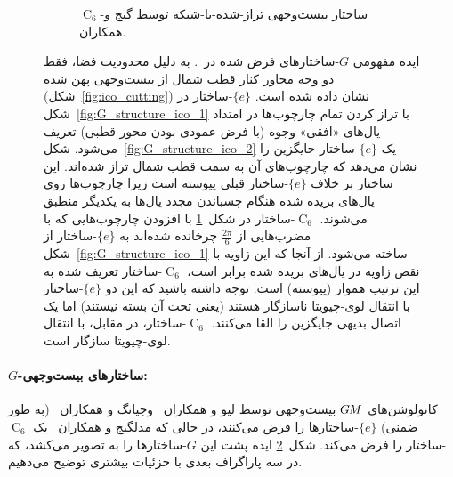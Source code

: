 \begin{figure}
\begin{subfigure}[b]{0.31\textwidth}
        \vspace*{-6pt}
        \captionsetup{width=.9\textwidth}
        \caption{\small
            $\operatorname{C}_6$-ساختار بیست‌وجهی تراز-شده-با-شبکه توسط گیج و همکاران\cite{gaugeIco2019}.
        }
        \label{fig:G_structure_ico_3}
    \end{subfigure}
    \caption{\small
        ایده مفهومی $G$-ساختارهای فرض شده در~\cite{liu2018icoAltAz,zhang2019orientation,gaugeIco2019}.
        به دلیل محدودیت فضا، فقط دو وجه مجاور کنار قطب شمال از بیست‌وجهی پهن شده (شکل~\ref{fig:ico_cutting}) نشان داده شده است.
        $\{e\}$-ساختار در شکل~\ref{fig:G_structure_ico_1} با تراز کردن تمام چارچوب‌ها در امتداد یال‌های «افقی» وجوه (با فرض عمودی بودن محور قطبی) تعریف می‌شود.
        شکل~\ref{fig:G_structure_ico_2} یک $\{e\}$-ساختار جایگزین را نشان می‌دهد که چارچوب‌های آن به سمت قطب شمال تراز شده‌اند.
        این ساختار بر خلاف $\{e\}$-ساختار قبلی پیوسته است زیرا چارچوب‌ها روی یال‌های بریده شده هنگام چسباندن مجدد یال‌ها به یکدیگر منطبق می‌شوند.
        $\operatorname{C}_6$-ساختار در شکل~\ref{fig:G_structure_ico_3} با افزودن چارچوب‌هایی که با مضرب‌هایی از $\frac{2\pi}{6}$ چرخانده شده‌اند به $\{e\}$-ساختار از شکل~\ref{fig:G_structure_ico_1} ساخته می‌شود.
        از آنجا که این زاویه با نقص زاویه در یال‌های بریده شده برابر است، $\operatorname{C}_6$-ساختار تعریف شده به این ترتیب هموار (پیوسته) است.
        توجه داشته باشید که این دو $\{e\}$-ساختار با انتقال لوی-چیویتا ناسازگار هستند (یعنی تحت آن بسته نیستند) اما یک اتصال بدیهی جایگزین را القا می‌کنند.
        $\operatorname{C}_6$-ساختار، در مقابل، با انتقال لوی-چیویتا سازگار است.
    }
    \label{fig:G_structures_ico}
\end{figure}


\paragraph{$G$-ساختارهای بیست‌وجهی:}
کانولوشن‌های $G\mkern-1.4muM$ بیست‌وجهی توسط لیو و همکاران~\cite{liu2018icoAltAz} وجیانگ و همکاران~\cite{zhang2019orientation} (به طور ضمنی) $\{e\}$-ساختارها را فرض می‌کنند، در حالی که مدلگیج و همکاران~\cite{gaugeIco2019} یک $\operatorname{C}_6$-ساختار را فرض می‌کند.
شکل~\ref{fig:G_structures_ico} ایده پشت این $G$-ساختارها را به تصویر می‌کشد، که در سه پاراگراف بعدی با جزئیات بیشتری توضیح می‌دهیم.


